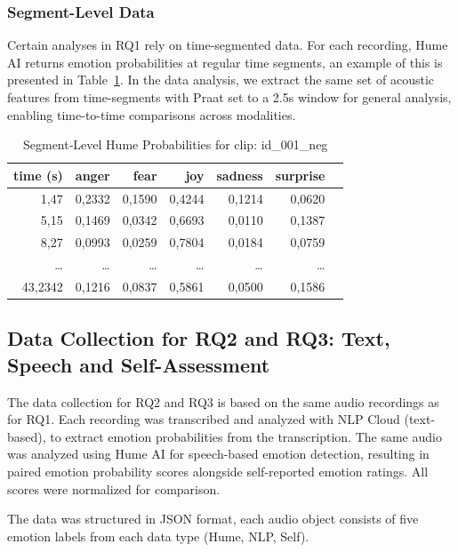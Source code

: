 \subsubsection{Segment-Level Data}
Certain analyses in RQ1 rely on time-segmented data. For each recording, Hume AI returns emotion probabilities at regular time segments, an example of this is presented in Table~\ref{tab:segments_hume_example}. 
In the data analysis, we extract the same set of acoustic features from time-segments with Praat set to a 2.5s window for general analysis, enabling time-to-time comparisons across modalities.
\begin{table}[H]
    \centering
    
    \begin{tabular}{rrrrrrl}
      \toprule
      \textbf{time (s)} & \textbf{anger} & \textbf{fear} & \textbf{joy} & \textbf{sadness} & \textbf{surprise} \\
      \midrule
      1,47    & 0,2332  & 0,1590 & 0,4244 & 0,1214 & 0,0620 \\
      5,15    & 0,1469  & 0,0342 & 0,6693 & 0,0110 & 0,1387 \\
      8,27    & 0,0993  & 0,0259 & 0,7804 & 0,0184 & 0,0759 \\
      \dots   & \dots   & \dots  & \dots  & \dots  & \dots  \\
      43,2342 & 0,1216  & 0,0837 & 0,5861 & 0,0500 & 0,1586 \\
      \bottomrule
    \end{tabular}
    \caption{Segment‐Level Hume Probabilities for clip: id\_001\_neg}
    \label{tab:segments_hume_example}
  \end{table}
  

\subsection{Data Collection for RQ2 and RQ3: Text, Speech and Self-Assessment}
\label{sec:datacoll_rq2_rq3}


The data collection for RQ2 and RQ3 is based on the same audio recordings as for RQ1. 
Each recording was transcribed and analyzed with NLP Cloud (text-based), to extract emotion probabilities from the transcription. The same audio was analyzed using Hume AI for speech-based emotion detection, resulting in paired emotion probability scores alongside self-reported emotion ratings. All scores were normalized for comparison.

The data was structured in JSON format, each audio object consists of five emotion labels from each data type (Hume, NLP, Self). 


